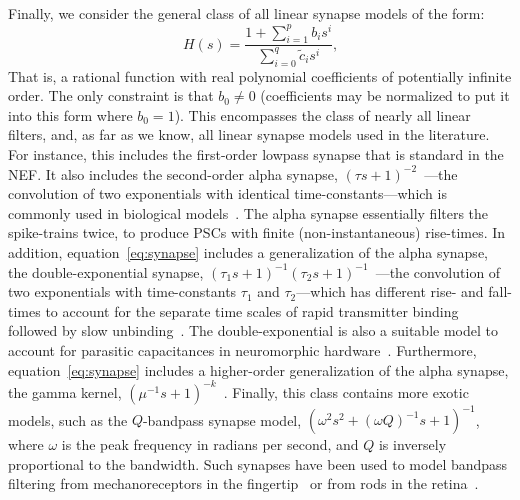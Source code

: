 Finally, we consider the general class of all linear synapse models of the form:
\begin{equation} \label{eq:synapse}
H(s) = \frac{1 + \sum_{i=1}^p b_i s^i}{\sum_{i=0}^q \tilde{c}_i s^i} \text{,}
\end{equation}
That is, a rational function with real polynomial coefficients of potentially infinite order.
The only constraint is that $b_0 \ne 0$ (coefficients may be normalized to put it into this form where $b_0 = 1$).
This encompasses the class of nearly all linear filters, and, as far as we know, all linear synapse models used in the literature.
For instance, this includes the first-order lowpass synapse that is standard in the NEF.
It also includes the second-order alpha synapse, $(\tau s + 1)^{-2}$~\citep{rall1967distinguishing}---the convolution of two exponentials with identical time-constants---which is commonly used in biological models~\citep{koch1989methods, destexhe1994synthesis, mainen1995reliability, destexhe1998kinetic, roth2009modeling}.
The alpha synapse essentially filters the spike-trains twice, to produce PSCs with finite (non-instantaneous) rise-times.
In addition, equation~\ref{eq:synapse} includes a generalization of the alpha synapse, the double-exponential synapse, $(\tau_1 s + 1)^{-1}(\tau_2 s + 1)^{-1}$~\citep{wilson1989simulation}---the convolution of two exponentials with time-constants $\tau_1$ and $\tau_2$---which has different rise- and fall-times to account for the separate time scales of rapid transmitter binding followed by slow unbinding~\citep{destexhe1994synthesis, hausser1997estimating, roth2009modeling}.
The double-exponential is also a suitable model to account for parasitic capacitances in neuromorphic hardware~\citep{voelker2017iscas}.
Furthermore, equation~\ref{eq:synapse} includes a higher-order generalization of the alpha synapse, the gamma kernel, $(\mu^{-1} s + 1)^{-k}$~\citep[][equation 19]{de1992gamma}. 
Finally, this class contains more exotic models, such as the $Q$-bandpass synapse model, $({\omega^2}s^2 + (\omega Q)^{-1}s + 1)^{-1}$, where $\omega$ is the peak frequency in radians per second, and $Q$ is inversely proportional to the bandwidth.
Such synapses have been used to model bandpass filtering from mechanoreceptors in the fingertip~\citep{voelker2016a} or from rods in the retina~\citep{armstrong2003bandpass}.

